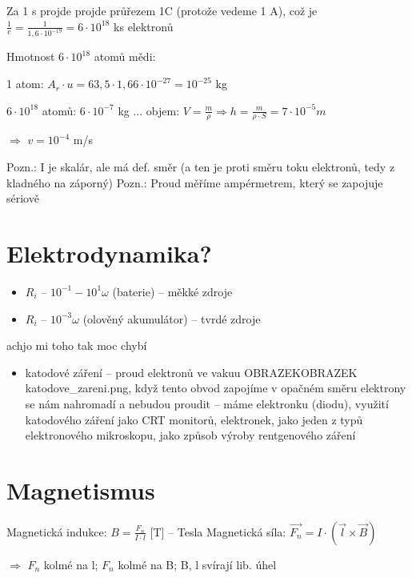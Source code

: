 \documentclass{article}
\begin{document}
Za 1 s projde projde průřezem 1C (protože vedeme 1 A), což je $\frac{1}{e} = \frac{1}{1,6\cdot 10^{-19}} = 6\cdot 10^{18}$ ks elektronů

Hmotnost $6\cdot10^{18}$ atomů mědi:

  \hspace{10 px} 1 atom: $A_r \cdot u = 63,5 \cdot 1,66 \cdot 10^{-27} = 10^{-25}$ kg

  \hspace{10 px} $6 \cdot 10^{18}$ atomů: $6 \cdot 10^{-7}$ kg ... objem: $V = \frac{m}{\rho} \Rightarrow h = \frac{m}{\rho \cdot S} = 7 \cdot 10^{-5} m$

\hspace{-10 px} $\Rightarrow$ $v = 10^{-4} $ m/s

Pozn.: I je skalár, ale má def. směr (a ten je proti směru toku elektronů, tedy z kladného na záporný)
Pozn.: Proud měříme ampérmetrem, který se zapojuje sériově

\part{Elektrodynamika?}
\begin{itemize}
  \item $R_i$ -- $10^{-1} - 10^{1} \omega$ (baterie) -- měkké zdroje
  \item $R_i$ -- $10^{-3} \omega$ (olověný akumulátor) -- tvrdé zdroje
\end{itemize}

achjo mi toho tak moc chybí
\begin{itemize}
  \item katodové záření -- proud elektronů ve vakuu OBRAZEKOBRAZEK katodove\_zareni.png, když tento obvod zapojíme v opačném směru elektrony se nám nahromadí a nebudou proudit -- máme elektronku (diodu), využití katodového záření jako CRT monitorů, elektronek, jako jeden z typů elektronového mikroskopu, jako způsob výroby rentgenového záření
\end{itemize}

\newpage
\part{Magnetismus}

Magnetická indukce: $B = \frac{F_n}{I \cdot l}$ [T] -- Tesla \newline
Magnetická síla: $\overrightarrow{F_n} = I \cdot (\overrightarrow{l} \times \overrightarrow{B})$

$\Rightarrow$ $F_n$ kolmé na l; $F_n$ kolmé na B; B, l svírají lib. úhel
\end{document}
